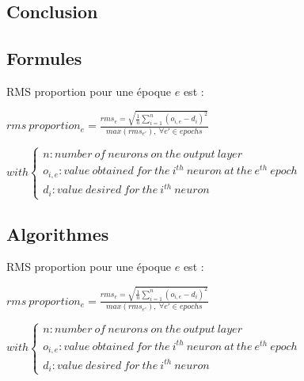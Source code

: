 \documentclass[a4paper,12pt]{article}
\begin{document}
    \subsection*{Conclusion}
    
    


    \subsection*{Formules}
      RMS proportion pour une époque $e$ est :
      \begin{center}
      \begin{large}
      $ rms\ proportion_{e} = \frac{ rms_{e} = \sqrt{ \frac{1}{n} \sum \limits_{i=1}^{n} 
      ( o_{i,e} - d_{i} )^2 }}{max(rms_{e'}),\ \forall e' \in epochs } $
      \end{large}
      $ with \left\lbrace \begin{array}{lll} n : number\ of\ neurons\ on\ the\ output\ 
      layer\\o_{i,e} : value\ obtained\ for\ the\ i^{th}\ neuron\ at\ the\ e^{th}\ epoch\\d_{i} : 
      value\ desired \ for\ the\ i^{th}\ neuron\end{array} \right.$
      \end{center}
      
    \subsection*{Algorithmes}
      RMS proportion pour une époque $e$ est :
      \begin{center}
      \begin{large}
      $ rms\ proportion_{e} = \frac{ rms_{e} = \sqrt{ \frac{1}{n} \sum \limits_{i=1}^{n} 
      ( o_{i,e} - d_{i} )^2 }}{max(rms_{e'}),\ \forall e' \in epochs } $
      \end{large}
      $ with \left\lbrace \begin{array}{lll} n : number\ of\ neurons\ on\ the\ output\ 
      layer\\o_{i,e} : value\ obtained\ for\ the\ i^{th}\ neuron\ at\ the\ e^{th}\ epoch\\d_{i} : 
      value\ desired \ for\ the\ i^{th}\ neuron\end{array} \right.$
      \end{center}

  
  
\end{document}
